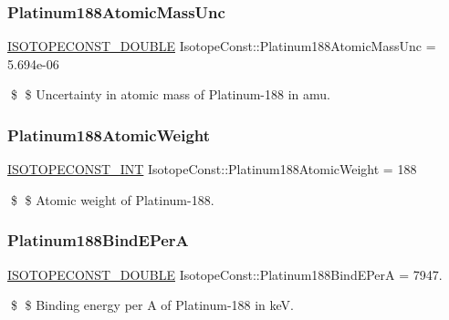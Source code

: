 \subsubsection{\texorpdfstring{Platinum188\+Atomic\+Mass\+Unc}{Platinum188AtomicMassUnc}}
{\footnotesize\ttfamily \mbox{\hyperlink{group___isotope_const-_macros_ga8f45a7272ce02c0b4c65c44636ed719a}{I\+S\+O\+T\+O\+P\+E\+C\+O\+N\+S\+T\+\_\+\+D\+O\+U\+B\+LE}} Isotope\+Const\+::\+Platinum188\+Atomic\+Mass\+Unc = 5.\+694e-\/06}

\$ \$ Uncertainty in atomic mass of Platinum-\/188 in amu. \mbox{\label{group___isotope_const-_platinum-_pt188_gaaee9aa5ae22b08415fe3ba50049232a5}} 
\subsubsection{\texorpdfstring{Platinum188\+Atomic\+Weight}{Platinum188AtomicWeight}}
{\footnotesize\ttfamily \mbox{\hyperlink{group___isotope_const-_macros_ga5f18360b3e99483a35c32d789e62621c}{I\+S\+O\+T\+O\+P\+E\+C\+O\+N\+S\+T\+\_\+\+I\+NT}} Isotope\+Const\+::\+Platinum188\+Atomic\+Weight = 188}

\$ \$ Atomic weight of Platinum-\/188. \mbox{\label{group___isotope_const-_platinum-_pt188_gaa7f4c234faeecc5c92db088f6421675f}} 
\subsubsection{\texorpdfstring{Platinum188\+Bind\+E\+PerA}{Platinum188BindEPerA}}
{\footnotesize\ttfamily \mbox{\hyperlink{group___isotope_const-_macros_ga8f45a7272ce02c0b4c65c44636ed719a}{I\+S\+O\+T\+O\+P\+E\+C\+O\+N\+S\+T\+\_\+\+D\+O\+U\+B\+LE}} Isotope\+Const\+::\+Platinum188\+Bind\+E\+PerA = 7947.}

\$ \$ Binding energy per A of Platinum-\/188 in keV. \mbox{\label{group___isotope_const-_platinum-_pt188_ga126b8e61629eaa0161bb39301400679e}} 

